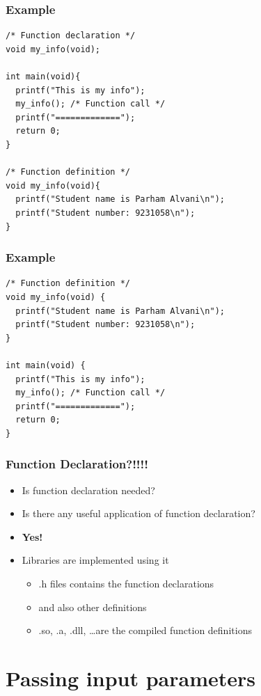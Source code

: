 \documentclass{../c-lecture}
\begin{document}
\begin{frame}[fragile]
  \frametitle{Example}
  \begin{verbatim}
/* Function declaration */
void my_info(void);

int main(void){
  printf("This is my info");
  my_info(); /* Function call */
  printf("=============");
  return 0;
}

/* Function definition */
void my_info(void){
  printf("Student name is Parham Alvani\n");
  printf("Student number: 9231058\n");
}
  \end{verbatim}
\end{frame}

\begin{frame}[fragile]
  \frametitle{Example}
  \begin{verbatim}
/* Function definition */
void my_info(void) {
  printf("Student name is Parham Alvani\n");
  printf("Student number: 9231058\n");
}

int main(void) {
  printf("This is my info");
  my_info(); /* Function call */
  printf("=============");
  return 0;
}
  \end{verbatim}
\end{frame}

\begin{frame}
  \frametitle{Function Declaration?!!!!}
  \begin{itemize}
    \item Is function declaration needed?
    \item Is there any useful application of function declaration?
    \item \textbf{\color{Orange} Yes!}
    \item Libraries are implemented using it
    \begin{itemize}
      \item .h files contains the function declarations
      \item and also other definitions
      \item .so, .a, .dll, \ldots are the compiled function definitions
    \end{itemize}
  \end{itemize}
\end{frame}

\section{Passing input parameters}
\end{document}
